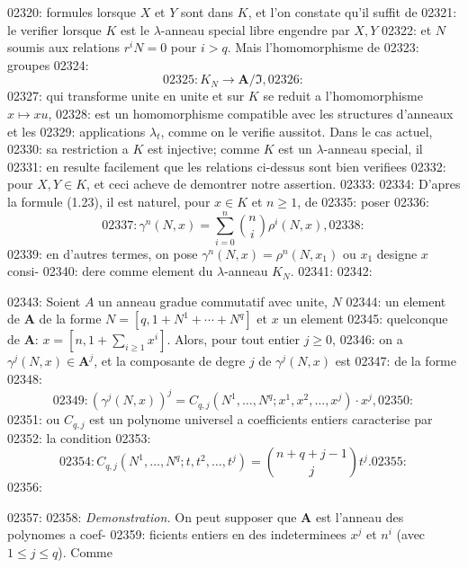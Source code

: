 02320: formules lorsque $X$ et $Y$ sont dans $K$, et l'on constate qu'il suffit de
02321: le verifier lorsque $K$ est le $\lambda$-anneau special libre engendre par $X, Y$
02322: et $N$ soumis aux relations $r^i N = 0$ pour $i > q$. Mais l'homomorphisme de
02323: groupes
02324: \begin{equation}
02325: K_N \longrightarrow \mathbf{A}/\mathfrak{I},
02326: \end{equation}
02327: qui transforme unite en unite et sur $K$ se reduit a l'homomorphisme $x \mapsto xu$,
02328: est un homomorphisme compatible avec les structures d'anneaux et les
02329: applications $\lambda_t$, comme on le verifie aussitot. Dans le cas actuel,
02330: sa restriction a $K$ est injective; comme $K$ est un $\lambda$-anneau special, il
02331: en resulte facilement que les relations ci-dessus sont bien verifiees
02332: pour $X, Y \in K$, et ceci acheve de demontrer notre assertion.
02333: 
02334: D'apres la formule (1.23), il est naturel, pour $x \in K$ et $n \geq 1$, de
02335: poser
02336: \begin{equation}
02337: \gamma^n(N, x) = \sum_{i=0}^{n} \binom{n}{i} \rho^i(N, x),
02338: \end{equation}
02339: en d'autres termes, on pose $\gamma^n(N, x) = \rho^n(N, x_1)$ ou $x_1$ designe $x$ consi-
02340: dere comme element du $\lambda$-anneau $K_N$.
02341: 
02342: \begin{proposition}
02343: Soient $A$ un anneau gradue commutatif avec unite, $N$
02344: un element de $\mathbf{A}$ de la forme $N = [q, 1 + N^1 + \cdots + N^q]$ et $x$ un element
02345: quelconque de $\mathbf{A}$: $x = [n, 1 + \sum_{i \geq 1} x^i]$. Alors, pour tout entier $j \geq 0$,
02346: on a $\gamma^j(N, x) \in \mathbf{A}^j$, et la composante de degre $j$ de $\gamma^j(N, x)$ est
02347: de la forme
02348: \begin{equation}
02349: (\gamma^j(N, x))^j = C_{q,j}(N^1, \ldots, N^q; x^1, x^2, \ldots, x^j) \cdot x^j,
02350: \end{equation}
02351: ou $C_{q,j}$ est un polynome universel a coefficients entiers caracterise par
02352: la condition
02353: \begin{equation}
02354: C_{q,j}(N^1, \ldots, N^q; t, t^2, \ldots, t^j) = \binom{n+q+j-1}{j} t^j.
02355: \end{equation}
02356: \end{proposition}
02357: 
02358: \textit{Demonstration.} On peut supposer que $\mathbf{A}$ est l'anneau des polynomes a coef-
02359: ficients entiers en des indeterminees $x^j$ et $n^i$ (avec $1 \leq j \leq q$). Comme
